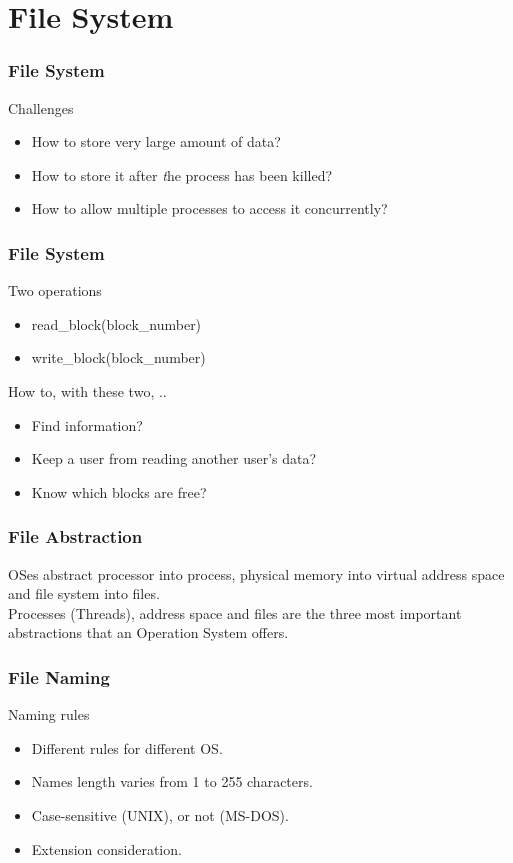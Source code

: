 \section{File System}

\begin{frame}
  \frametitle{File System}
  \begin{block}{Challenges}
    \begin{itemize}
      \item How to store very large amount of data?
      \item How to store it after {\emph the} process has been killed?
      \item How to allow multiple processes to access it concurrently?
    \end{itemize}
  \end{block}
\end{frame}

\begin{frame}
  \frametitle{File System}
  \begin{block}{Two operations}
    \begin{itemize}
      \item read\_block(block\_number)
      \item write\_block(block\_number)
    \end{itemize}
  \end{block} \pause
  \begin{block}{How to, with these two, ..}
    \begin{itemize}
      \item Find information?
      \item Keep a user from reading another user's data?
      \item Know which blocks are free?
    \end{itemize}
  \end{block}
\end{frame}

\begin{frame}
  \frametitle{File Abstraction}
  OSes abstract processor into process, physical memory into virtual address space and file system into files. \\
  Processes (Threads), address space and files are the three most important abstractions that an Operation System offers.
\end{frame}

\begin{frame}
  \frametitle{File Naming}
  \begin{block}{Naming rules}
    \begin{itemize}
      \item Different rules for different OS.
      \item Names length varies from 1 to 255 characters.
      \item Case-sensitive (UNIX), or not (MS-DOS).
      \item Extension consideration.
    \end{itemize}
  \end{block}
\end{frame}

